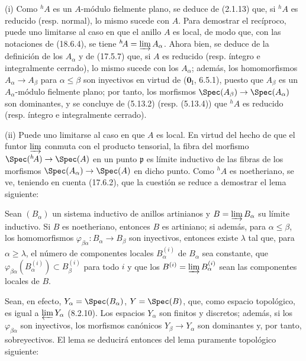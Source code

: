 
(i) Como ${}^h\!A$ es un $A$-módulo fielmente plano, se deduce de (2.1.13) que, si ${}^h\!A$ es reducido (resp. normal), lo mismo sucede con $A$. Para demostrar el recíproco, puede uno limitarse al caso en que el anillo $A$ es local, de modo que, con las notaciones de (18.6.4), se tiene ${}^h\!A=\varinjlim A_\alpha$. Ahora bien, se deduce de la definición de los $A_\alpha$ y de (17.5.7) que, si $A$ es reducido (resp. íntegro e integralmente cerrado), lo mismo sucede con los $A_\alpha$; además, los homomorfismos $A_\alpha\to A_\beta$ para $\alpha\leq\beta$ son inyectivos en virtud de ($\mathbf 0_{\mathrm I}$, 6.5.1), puesto que $A_\beta$ es un $A_\alpha$-módulo fielmente plano; por tanto, los morfismos $\Spec(A_\beta)\to\Spec(A_\alpha)$ son dominantes, y se concluye de (5.13.2) (resp. (5.13.4)) que ${}^h\!A$ es reducido (resp. íntegro e integralmente cerrado).

(ii) Puede uno limitarse al caso en que $A$ es local. En virtud del hecho de que el funtor $\varinjlim$ conmuta con el producto tensorial, la fibra del morfismo $\Spec({}^h\!A)\to\Spec(A)$ en un punto $\mathfrak p$ es límite inductivo de las fibras de los morfismos $\Spec(A_\alpha)\to\Spec(A)$ en dicho punto. Como ${}^h\!A$ es noetheriano, se ve, teniendo en cuenta (17.6.2), que la cuestión se reduce a demostrar el lema siguiente:

\begin{lemma}[18.6.9.1]
\label{IV.18.6.9.1}
Sean $(B_\alpha)$ un sistema inductivo de anillos artinianos y $B=\varinjlim B_\alpha$ su límite inductivo. Si $B$ es noetheriano, entonces $B$ es artiniano; si además, para $\alpha\leq\beta$, los homomorfismos $\varphi_{\beta\alpha}:B_\alpha\to B_\beta$ son inyectivos, entonces existe $\lambda$ tal que, para $\alpha\geq\lambda$, el número de componentes locales $B_\alpha^{(i)}$ de $B_\alpha$ sea constante, que $\varphi_{\beta\alpha}(B_\alpha^{(i)})\subset B_\beta^{(i)}$ para todo $i$ y que los $B^{(i)}=\varinjlim B_\alpha^{(i)}$ sean las componentes locales de $B$.
\end{lemma}

Sean, en efecto, $Y_\alpha=\Spec(B_\alpha)$, $Y=\Spec(B)$, que, como espacio topológico, es igual a $\varprojlim Y_\alpha$ (8.2.10). Los espacios $Y_\alpha$ son finitos y discretos; además, si los $\varphi_{\beta\alpha}$ son inyectivos, los morfismos canónicos $Y_\beta\to Y_\alpha$ son dominantes y, por tanto, sobreyectivos. El lema se deducirá entonces del lema puramente topológico siguiente:

